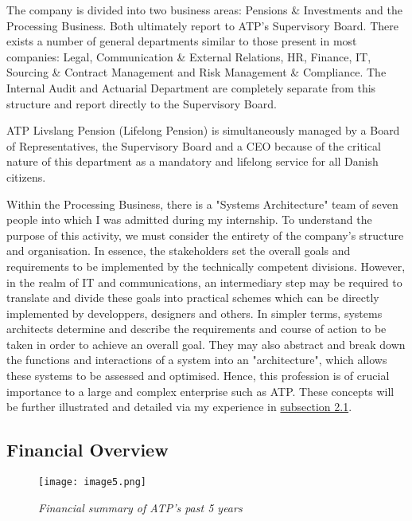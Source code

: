 The company is divided into two business areas: Pensions \& Investments and the
Processing Business. Both ultimately report to ATP’s Supervisory Board. There
exists a number of general departments similar to those present in most
companies: Legal, Communication \& External Relations, HR, Finance, IT, Sourcing
\& Contract Management and Risk Management \& Compliance. The Internal Audit and
Actuarial Department are completely separate from this structure and report
directly to the Supervisory Board.\cite{about_atp}

ATP Livslang Pension (Lifelong Pension) is simultaneously managed by a Board of
Representatives, the Supervisory Board and a CEO because of the critical nature
of this department as a mandatory and lifelong service for all Danish
citizens.\cite{about_atp,anno_report}

Within the Processing Business, there is a "Systems Architecture" team of seven
people into which I was admitted during my internship. To understand the purpose
of this activity, we must consider the entirety of the company's structure and
organisation. In essence, the stakeholders set the overall goals and
requirements to be implemented by the technically competent divisions. However,
in the realm of IT and communications, an intermediary step may be required to
translate and divide these goals into practical schemes which can be directly
implemented by developpers, designers and others. In simpler terms, systems
architects determine and describe the requirements and course of action to be
taken in order to achieve an overall goal. They may also abstract and break down
the functions and interactions of a system into an "architecture", which allows
these systems to be assessed and optimised.\cite{sys_arch} Hence, this
profession is of crucial importance to a large and complex enterprise such as
ATP. These concepts will be further illustrated and detailed via my experience
in \hyperlink{subsection.2.1}{subsection 2.1}.

\subsection{Financial Overview}

\begin{figure}[H]
    \centering
        \texttt{[image: image5.png]}
        \caption*{\textit{Financial summary of ATP's past 5
        years\cite{anno_report}}}
\end{figure}

